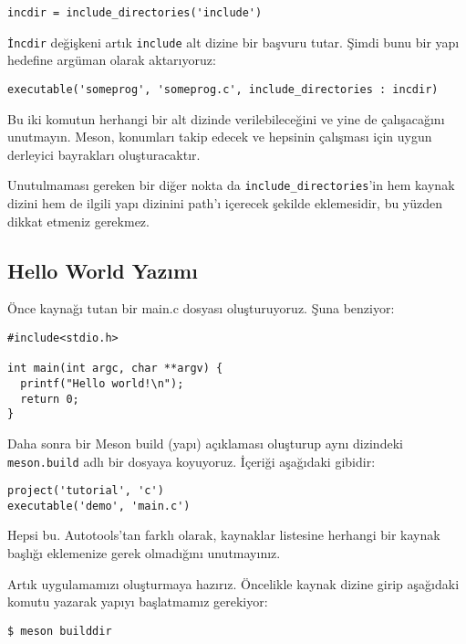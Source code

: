 \documentclass[
]{book}
\begin{document}
\begin{verbatim}
incdir = include_directories('include')
\end{verbatim}

\texttt{İncdir} değişkeni artık \texttt{include} alt dizine bir başvuru tutar. Şimdi bunu bir yapı hedefine argüman olarak aktarıyoruz:

\begin{verbatim}
executable('someprog', 'someprog.c', include_directories : incdir)
\end{verbatim}

Bu iki komutun herhangi bir alt dizinde verilebileceğini ve yine de çalışacağını unutmayın. Meson, konumları takip edecek ve hepsinin çalışması için uygun derleyici bayrakları oluşturacaktır.

Unutulmaması gereken bir diğer nokta da \texttt{include\_directories}'in hem kaynak dizini hem de ilgili yapı dizinini path'ı içerecek şekilde eklemesidir, bu yüzden dikkat etmeniz gerekmez.

\hypertarget{hello-world-yazux131mux131}{%
\subsection{Hello World Yazımı}\label{hello-world-yazux131mux131}}

Önce kaynağı tutan bir main.c dosyası oluşturuyoruz. Şuna benziyor:

\begin{verbatim}
#include<stdio.h>

int main(int argc, char **argv) {
  printf("Hello world!\n");
  return 0;
}
\end{verbatim}

Daha sonra bir Meson build (yapı) açıklaması oluşturup aynı dizindeki \texttt{meson.build} adlı bir dosyaya koyuyoruz. İçeriği aşağıdaki gibidir:

\begin{verbatim}
project('tutorial', 'c')
executable('demo', 'main.c')
\end{verbatim}

Hepsi bu. Autotools'tan farklı olarak, kaynaklar listesine herhangi bir kaynak başlığı eklemenize gerek olmadığını unutmayınız.

Artık uygulamamızı oluşturmaya hazırız. Öncelikle kaynak dizine girip aşağıdaki komutu yazarak yapıyı başlatmamız gerekiyor:

\begin{verbatim}
$ meson builddir
\end{verbatim}
\end{document}
